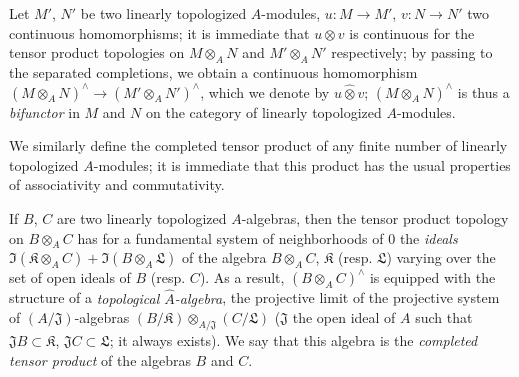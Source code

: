 \begin{env}[7.7.3]
\label{0.7.7.3}
Let $M'$, $N'$ be two linearly topologized $A$-modules, $u:M\to M'$, $v:N\to N'$ two continuous
homomorphisms; it is immediate that $u\otimes v$ is continuous for the tensor product topologies on
$M\otimes_A N$ and $M'\otimes_A N'$ respectively; by passing to the separated completions, we obtain
a continuous homomorphism $(M\otimes_A N)^\wedge\to(M'\otimes_A N')^\wedge$, which we denote by
$u\widehat{\otimes}v$; $(M\otimes_A N)^\wedge$ is thus a {\em bifunctor} in $M$ and $N$ on the category
of linearly topologized $A$-modules.
\end{env}

\begin{env}[7.7.4]
\label{0.7.7.4}
We similarly define the completed tensor product of any finite number of linearly topologized
$A$-modules; it is immediate that this product has the usual properties of associativity and
commutativity.
\end{env}

\begin{env}[7.7.5]
\label{0.7.5.5}
If $B$, $C$ are two linearly topologized $A$-algebras, then the tensor product topology on
$B\otimes_A C$ has for a fundamental system of neighborhoods of $0$ the {\em ideals}
$\Im(\mathfrak{K}\otimes_A C)+\Im(B\otimes_A\mathfrak{L})$ of the algebra $B\otimes_A C$,
$\mathfrak{K}$ (resp. $\mathfrak{L}$) varying over the set of open ideals of $B$ (resp. $C$).
As a result, $(B\otimes_A C)^\wedge$ is equipped with the structure of a {\em topological
$\widehat{A}$-algebra}, the projective limit of the projective system of $(A/\mathfrak{J})$-algebras
$(B/\mathfrak{K})\otimes_{A/\mathfrak{J}}(C/\mathfrak{L})$ ($\mathfrak{J}$ the open ideal of $A$
such that $\mathfrak{J}B\subset\mathfrak{K}$, $\mathfrak{J}C\subset\mathfrak{L}$; it always exists).
We say that this algebra is the {\em completed tensor product} of the algebras $B$ and $C$.
\end{env}

